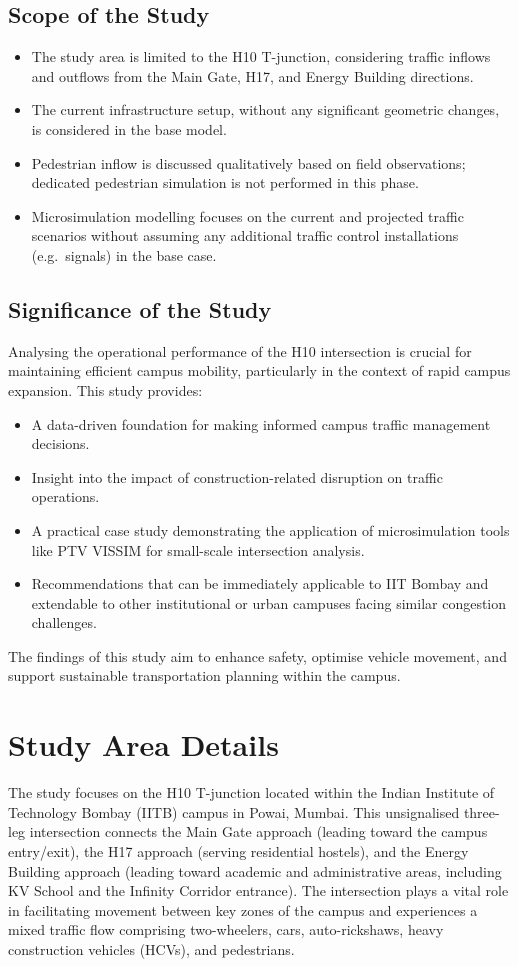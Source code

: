 \documentclass[11pt]{article}
\begin{document}
\subsection{Scope of the Study}
\begin{itemize}
  \item The study area is limited to the H10 T-junction, considering traffic inflows and outflows from
  the Main Gate, H17, and Energy Building directions.
  \item The current infrastructure setup, without any significant geometric changes, is considered in
  the base model.
  \item Pedestrian inflow is discussed qualitatively based on field observations; dedicated pedestrian
  simulation is not performed in this phase.
  \item Microsimulation modelling focuses on the current and projected traffic scenarios without
  assuming any additional traffic control installations (e.g.\ signals) in the base case.
\end{itemize}

\subsection{Significance of the Study}
Analysing the operational performance of the H10 intersection is crucial for maintaining efficient
campus mobility, particularly in the context of rapid campus expansion. This study provides:
\begin{itemize}
  \item A data-driven foundation for making informed campus traffic management decisions.
  \item Insight into the impact of construction-related disruption on traffic operations.
  \item A practical case study demonstrating the application of microsimulation tools like PTV VISSIM
  for small-scale intersection analysis.
  \item Recommendations that can be immediately applicable to IIT Bombay and extendable to other
  institutional or urban campuses facing similar congestion challenges.
\end{itemize}
The findings of this study aim to enhance safety, optimise vehicle movement, and support sustainable
transportation planning within the campus.

\section{Study Area Details}
The study focuses on the H10 T-junction located within the Indian Institute of Technology Bombay (IITB)
campus in Powai, Mumbai. This unsignalised three-leg intersection connects the Main Gate approach
(leading toward the campus entry/exit), the H17 approach (serving residential hostels), and the Energy
Building approach (leading toward academic and administrative areas, including KV School and the
Infinity Corridor entrance). The intersection plays a vital role in facilitating movement between key
zones of the campus and experiences a mixed traffic flow comprising two-wheelers, cars, auto-rickshaws,
heavy construction vehicles (HCVs), and pedestrians.
\end{document}
